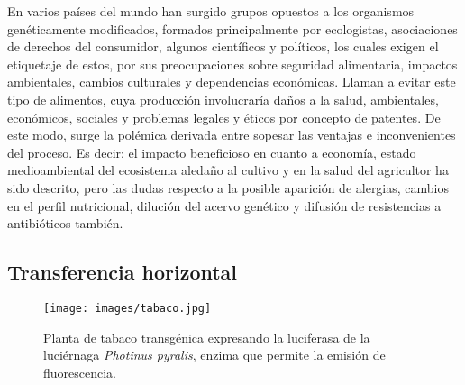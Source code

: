 \documentclass[11pt,twoside]{article}
\begin{document}
En varios países del mundo han surgido grupos opuestos a los organismos genéticamente modificados, formados principalmente por ecologistas, asociaciones de derechos del consumidor, algunos científicos y políticos, los cuales exigen el etiquetaje de estos, por sus preocupaciones sobre seguridad alimentaria, impactos ambientales, cambios culturales y dependencias económicas. 
Llaman a evitar este tipo de alimentos, cuya producción involucraría daños a la salud, ambientales, económicos, sociales y problemas legales y éticos por concepto de patentes.
De este modo, surge la polémica derivada entre sopesar las ventajas e inconvenientes del proceso. Es decir: el impacto beneficioso en cuanto a economía, estado medioambiental del ecosistema aledaño al cultivo y en la salud del agricultor ha sido descrito, pero las dudas respecto a la posible aparición de alergias, cambios en el perfil nutricional, dilución del acervo genético y difusión de resistencias a antibióticos también.












\subsection{Transferencia horizontal}


%



\begin{figure}[h!]
\begin{center}
\texttt{[image: images/tabaco.jpg]}
\end{center}
\caption{Planta de tabaco transgénica expresando la luciferasa de la luciérnaga \textit{Photinus pyralis}, enzima que permite la emisión de fluorescencia.}\label{fig.tabaco}
\end{figure}
\end{document}
